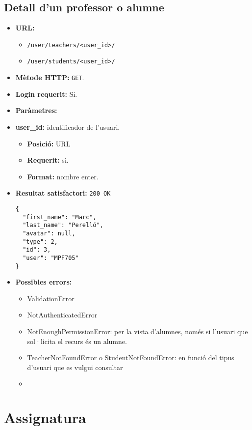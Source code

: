 \subsection{Detall d'un professor o alumne}
\begin{itemize}
\item \textbf{\ac{URL}:} 
	\begin{itemize}
		\item \texttt{/user/teachers/<user\_id>/}
		\item \texttt{/user/students/<user\_id>/}
	\end{itemize}
\item \textbf{Mètode \ac{HTTP}: } \texttt{GET}.
\item \textbf{Login requerit:} Si.
\item \textbf{Paràmetres:} 
	\item \textbf{user\_id:} identificador de l'usuari.	
		\begin{itemize}
			\item \textbf{Posició:} \ac{URL}
			\item \textbf{Requerit:} si.
			\item \textbf{Format:} nombre enter.
		\end{itemize}
	
\item \textbf{Resultat satisfactori:} \texttt{200 OK}
	\begin{verbatim}
{
  "first_name": "Marc",
  "last_name": "Perelló",
  "avatar": null,
  "type": 2,
  "id": 3,
  "user": "MPF705"
}
	\end{verbatim}
\item \textbf{Possibles errors:}
	\begin{itemize}
		\item ValidationError
		\item NotAuthenticatedError
		\item NotEnoughPermissionError: per la vista d'alumnes, només si l'usuari que sol·licita el recurs és un alumne.
		\item TeacherNotFoundError o StudentNotFoundError: en funció del tipus d'usuari que es vulgui consultar
		\item 
	\end{itemize}
\end{itemize}

\section{Assignatura}

